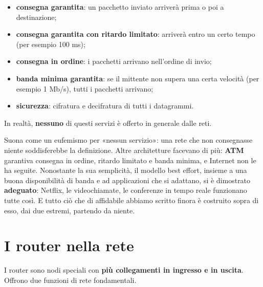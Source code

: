 \begin{itemize}
    \item \textbf{consegna garantita}: un pacchetto inviato arriverà prima o poi a destinazione;
    \item \textbf{consegna garantita con ritardo limitato}: arriverà entro un certo tempo (per esempio 100 ms);
    \item \textbf{consegna in ordine}: i pacchetti arrivano nell'ordine di invio;
    \item \textbf{banda minima garantita}: se il mittente non supera una certa velocità (per esempio 1 Mb/s), tutti i
          pacchetti arrivano;
    \item \textbf{sicurezza}: cifratura e decifratura di tutti i datagrammi.
\end{itemize}

In realtà, \textbf{nessuno} di questi servizi è offerto in generale dalle reti.


Suona come un eufemismo per «nessun servizio»: una rete che non consegnasse niente soddisferebbe la definizione. Altre
architetture facevano di più: \textbf{ATM} garantiva consegna in ordine, ritardo limitato e banda minima, e Internet non
le ha seguite. Nonostante la sua semplicità, il modello best effort, insieme a una buona disponibilità di banda e ad
applicazioni che si adattano, si è dimostrato \textbf{adeguato}: Netflix, le videochiamate, le conferenze in tempo reale
funzionano tutte così. E tutto ciò che di affidabile abbiamo scritto finora è costruito sopra di esso, dai due estremi,
partendo da niente.

\section{I router nella rete}

I router sono nodi speciali con \textbf{più collegamenti in ingresso e in uscita}. Offrono due funzioni di rete
fondamentali.


